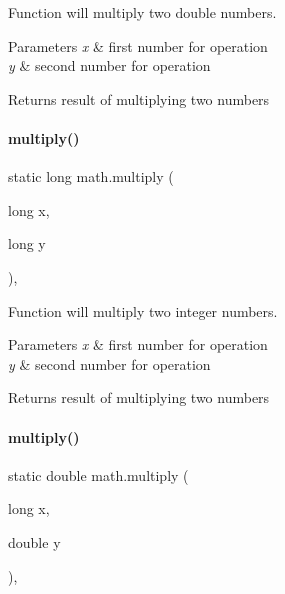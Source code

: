 Function will multiply two double numbers. 


\begin{DoxyParams}{Parameters}
{\em x} & first number for operation \\
\hline
{\em y} & second number for operation \\
\hline
\end{DoxyParams}
\begin{DoxyReturn}{Returns}
result of multiplying two numbers 
\end{DoxyReturn}
\mbox{\label{classmath_a35d65c04f2cc9e4565d4f11294e1d191}} 
\paragraph{\texorpdfstring{multiply()}{multiply()}\hspace{0.1cm}{\footnotesize\ttfamily [2/4]}}
{\footnotesize\ttfamily static long math.\+multiply (\begin{DoxyParamCaption}\item[{long}]{x,  }\item[{long}]{y }\end{DoxyParamCaption})\hspace{0.3cm}{\ttfamily [inline]}, {\ttfamily [static]}}



Function will multiply two integer numbers. 


\begin{DoxyParams}{Parameters}
{\em x} & first number for operation \\
\hline
{\em y} & second number for operation \\
\hline
\end{DoxyParams}
\begin{DoxyReturn}{Returns}
result of multiplying two numbers 
\end{DoxyReturn}
\mbox{\label{classmath_aedc67ea56f41744708cd85d151cf8973}} 
\paragraph{\texorpdfstring{multiply()}{multiply()}\hspace{0.1cm}{\footnotesize\ttfamily [3/4]}}
{\footnotesize\ttfamily static double math.\+multiply (\begin{DoxyParamCaption}\item[{long}]{x,  }\item[{double}]{y }\end{DoxyParamCaption})\hspace{0.3cm}{\ttfamily [inline]}, {\ttfamily [static]}}



